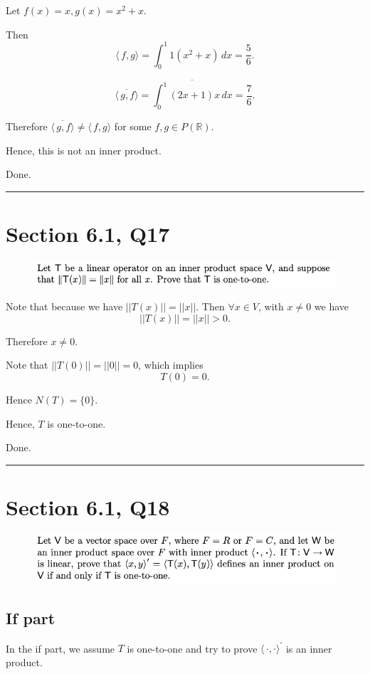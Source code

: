 \documentclass[12pt]{article}%
\begin{document}
Let $f(x)=x, g(x)=x^2+x.$

Then $$\langle\, f,g \rangle=\int_{0}^{1} 1(x^2+x) \,dx=\frac{5}{6}.$$

$$\overline{\langle\, g,f \rangle}=\overline{\int_{0}^{1} (2x+1)x \,dx}=\frac{7}{6}.$$

Therefore $\overline{\langle\, g,f \rangle} \neq \langle\, f,g \rangle$ for some $f,g \in P(\mathbb{R}).$

Hence, this is not an inner product.

Done.

\noindent\rule[0.1ex]{\linewidth}{1pt}

\section{Section 6.1, Q17}
\begin{figure}[htp]
    \includegraphics[width = 15cm]{img/Q2.png}
\end{figure}

Note that because we have $||T(x)||=||x||.$ Then $\forall x\in V$, with $x\neq 0$ we have $$||T(x)||=||x||>0.$$

Therefore $x\neq 0.$ 

Note that $||T(0)||=||0||=0$, which implies $$T(0)=0.$$

Hence $N(T)=\{0\}.$

Hence, $T$ is one-to-one.

Done.

\noindent\rule[0.1ex]{\linewidth}{1pt}


\section{Section 6.1, Q18}
\begin{figure}[htp]
    \includegraphics[width = 15cm]{img/Q3.png}
\end{figure}

\subsection{If part}
In the if part, we assume $T$ is one-to-one and try to prove $\langle\, \cdot , \cdot \rangle^{'}$ is an inner product.
\end{document}
